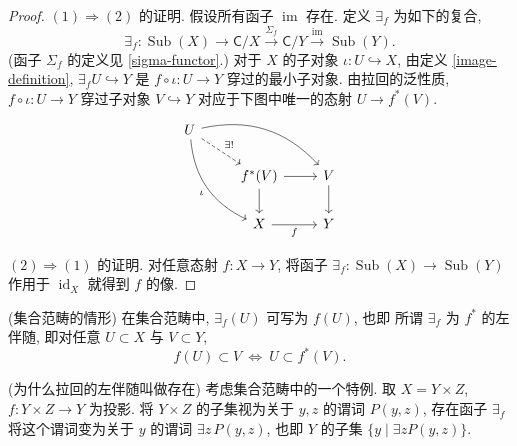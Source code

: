 \begin{proof}
    $(1) \Rightarrow (2)$ 的证明. 假设所有函子 $\operatorname{im}$ 存在. 定义 $\exists_f$ 为如下的复合,
    $$
    \exists_f \colon \operatorname{Sub}(X)
    \longrightarrow
    \mathsf C / X
    \overset{\Sigma_f}{\longrightarrow}
    \mathsf C / Y
    \overset{\operatorname{im}}{\longrightarrow}
    \operatorname{Sub}(Y).
    $$
    (函子 $\Sigma_f$ 的定义见 \ref{sigma-functor}.)
    对于 $X$ 的子对象 $\iota \colon U \hookrightarrow X$,
    由定义 \ref{image-definition}, $\exists_f U \hookrightarrow Y$ 是 $f\circ\iota \colon U \to Y$ 穿过的最小子对象.
    由拉回的泛性质, $f\circ\iota \colon U \to Y$ 穿过子对象 $V\hookrightarrow Y$ 对应于下图中唯一的态射 $U\to f^*(V)$.
\[\begin{tikzcd}[ampersand replacement=\&]
	U \\
	\& {f^*(V)} \& V \\
	\& X \& Y
	\arrow[bend left,from=1-1, to=2-3]
	\arrow[from=2-3, to=3-3]
	\arrow[bend right,"\iota"', from=1-1, to=3-2]
	\arrow["f"', from=3-2, to=3-3]
	\arrow[from=2-2, to=3-2]
	\arrow[from=2-2, to=2-3]
	\arrow["{\exists !}", dashed, from=1-1, to=2-2]
\end{tikzcd}\]

    $(2) \Rightarrow (1)$ 的证明. 对任意态射 $f \colon X \to Y$, 将函子 $\exists_f \colon \operatorname{Sub}(X) \to \operatorname{Sub}(Y)$ 作用于 $\operatorname{id}_X$ 就得到 $f$ 的像.
\end{proof}

\begin{remark}
    {(集合范畴的情形)}
    在集合范畴中, $\exists_f(U)$ 可写为 $f(U)$, 也即 
    所谓 $\exists_f$ 为 $f^*$ 的左伴随, 即对任意
    $U\subset X$ 与 $V\subset Y$,
    $$
    f(U) \subset V
    \ \Longleftrightarrow \ 
    U\subset f^*(V).
    $$
\end{remark}

\begin{remark}{(为什么拉回的左伴随叫做存在)}
    考虑集合范畴中的一个特例. 取 $X = Y \times Z$, $f \colon Y \times Z \to Y$ 为投影.
    将 $Y\times Z$ 的子集视为关于 $y,z$ 的谓词 $P(y,z)$,
    存在函子 $\exists_f$ 将这个谓词变为关于 $y$ 的谓词 $\exists z \,P(y,z)$, 也即 $Y$ 的子集 $\{y \mid \exists z P(y,z)\}$.
\end{remark}

